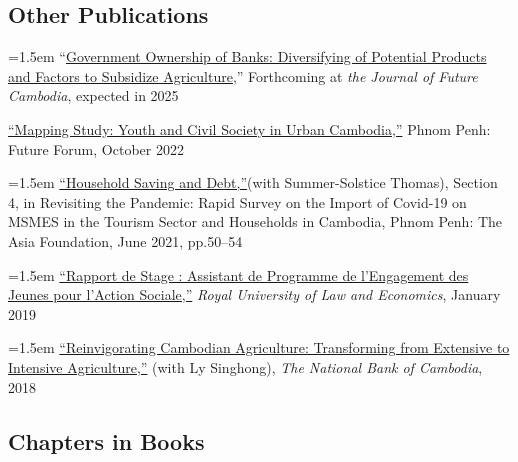 \documentclass[10pt,a4paper]{article}
\begin{document}
\subsection*{Other Publications}

	\hangindent=1.5em
	“\href{https://kosalnith.github.io/research/papers/GOB.pdf}{Government Ownership of Banks: Diversifying of Potential Products and Factors to Subsidize Agriculture},” Forthcoming at \textit{the Journal of Future Cambodia}, expected in 2025 \\ \vspace{-.5em} 
	
	\href{}{``Mapping Study: Youth and Civil Society in Urban Cambodia,”} Phnom Penh: Future Forum, October 2022\\ \vspace{-.5em} 
	
	\hangindent=1.5em
	\href{https://kosalnith.github.io/research/policies/COVID-19-HHSavingsDebt.pdf}{``Household Saving and Debt,”}(with Summer-Solstice Thomas), Section 4, in Revisiting the Pandemic: Rapid Survey on the Import of Covid-19 on MSMES in the Tourism Sector and Households in Cambodia, Phnom Penh: The Asia Foundation, June 2021, pp.50--54\\ \vspace{-.5em} 
			
	\hangindent=1.5em
	\href{https://www.researchgate.net/publication/330936932_Rapport_du_Stage_Assistant_de_Programme_a_l%27YRDP}{``Rapport de Stage : Assistant de Programme de l'Engagement des Jeunes pour l'Action Sociale,”} \textit{Royal University of Law and Economics}, January 2019 \\ \vspace{-.5em}
			
	\hangindent=1.5em
	\href{https://ideas.repec.org/p/pra/mprapa/93086.html}{``Reinvigorating Cambodian Agriculture: Transforming from Extensive to Intensive Agriculture,”} (with Ly Singhong), \textit{The National Bank of Cambodia}, 2018 
\subsection*{Chapters in Books}
\end{document}
